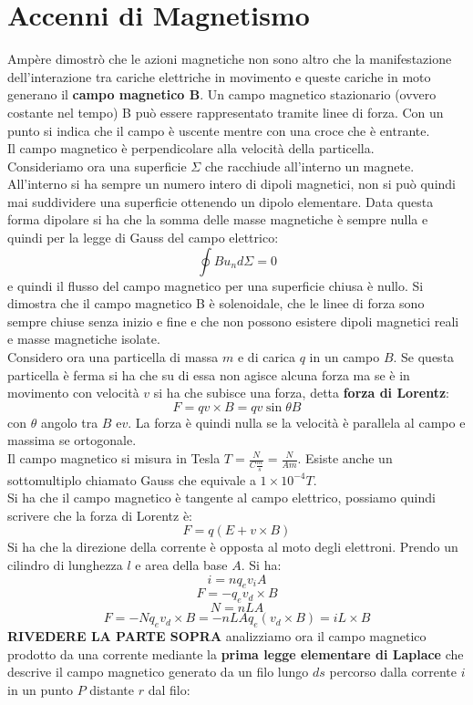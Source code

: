 \documentclass[a4paper,12pt, oneside]{book}
\begin{document}
\section{Accenni di Magnetismo}
Ampère dimostrò che le azioni magnetiche non sono altro che la manifestazione dell'interazione tra cariche elettriche in movimento e queste cariche in moto generano il \textbf{campo magnetico B}. Un campo magnetico stazionario (ovvero costante nel tempo) B può essere rappresentato tramite linee di forza. Con un punto si indica che il campo è uscente mentre con una croce che è entrante. \\
Il campo magnetico è perpendicolare alla velocità della particella.\\
Consideriamo ora una superficie $\Sigma$ che racchiude all'interno un magnete. All'interno si ha sempre un numero intero di dipoli magnetici, non si può quindi mai suddividere una superficie ottenendo un dipolo elementare. Data questa forma dipolare si ha che la somma delle masse magnetiche è sempre nulla e quindi per la legge di Gauss del campo elettrico:
$$\oint Bu_nd\Sigma=0$$
e quindi il flusso del campo magnetico per una superficie chiusa è nullo. Si dimostra che il campo magnetico B è solenoidale, che le linee di forza sono sempre chiuse senza inizio e fine e che non possono esistere dipoli magnetici reali e masse magnetiche isolate.
\\Considero ora una particella di massa $m$ e di carica $q$ in un campo $B$. Se questa particella è ferma si ha che su di essa non agisce alcuna forza ma se è in movimento con velocità $v$ si ha che subisce una forza, detta \textbf{forza di Lorentz}:
$$F=qv\times B=qv\sin\theta B$$
con $\theta$ angolo tra $B$ e$v$. La forza è quindi nulla se la velocità è parallela al campo e massima se ortogonale. \\
Il campo magnetico si misura in Tesla $T=\frac{N}{C\frac{m}{s}}=\frac{N}{Am}$. Esiste anche un sottomultiplo chiamato Gauss che equivale a $1\times 10^{-4}T$.\\
Si ha che il campo magnetico è tangente al campo elettrico, possiamo quindi scrivere che la forza di Lorentz è:
$$F=q(E+v\times B)$$
Si ha che la direzione della corrente è opposta al moto degli elettroni. Prendo un cilindro di lunghezza $l$ e area della base $A$. Si ha:
$$i=nq_ev_iA$$
$$F=-q_ev_d\times B$$
$$N=nLA$$
$$F=-Nq_ev_d\times B=-nLAq_e(v_d\times B)=iL\times B$$
\textbf{RIVEDERE LA PARTE SOPRA}
analizziamo ora il campo magnetico prodotto da una corrente mediante la \textbf{prima legge elementare di Laplace} che descrive il campo magnetico generato da un filo lungo $ds$ percorso dalla corrente $i$ in un punto $P$ distante $r$ dal filo:
\end{document}
